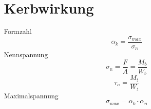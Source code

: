 



\section{Kerbwirkung}
Formzahl
\[ \alpha_k = \frac{\sigma_{max}}{\sigma_n} \]
Nennspannung
\[ \sigma_n = \frac{F}{A} = \frac{M_b}{W_b} \]
\[ \tau_n = \frac{M_t}{W_t} \]
Maximalspannung
\[ \sigma_{max} = \alpha_k \cdot \alpha_n \]
